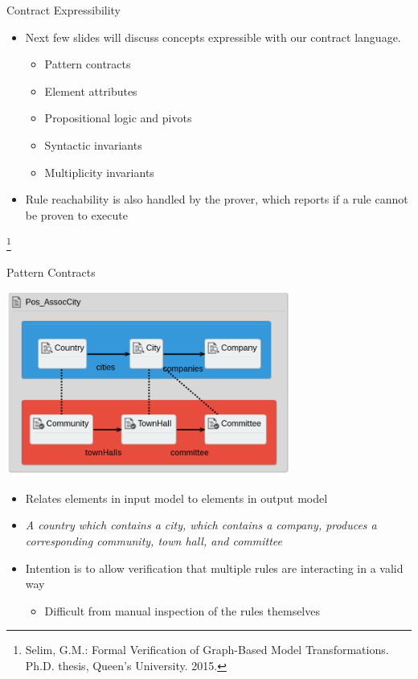 \documentclass[xcolor=dvipsnames, 12pt, handout]{beamer}
\newcommand\blfootnote[1]{%
  \begingroup
  \renewcommand\thefootnote{}\footnote{#1}%
  \addtocounter{footnote}{-1}%
  \endgroup
}
\begin{document}
\begin{frame}{Contract Expressibility}

\begin{itemize}[<+->]
\item Next few slides will discuss concepts expressible with our contract language.

\begin{itemize}[<+->]
\item Pattern contracts
\item Element attributes
\item Propositional logic and pivots
\item Syntactic invariants
\item Multiplicity invariants
\end{itemize}
\end{itemize}

\begin{itemize}
\item Rule reachability is also handled by the prover, which reports if a rule cannot be proven to execute
\end{itemize}

\blfootnote{Selim, G.M.: Formal Verification of Graph-Based Model Transformations. Ph.D. thesis, Queen’s University. 2015.}
\end{frame}

\begin{frame}{Pattern Contracts}
\begin{center}
\includegraphics[width=0.7\textwidth]{figures/Pos_AssocCity}
\end{center}
\begin{itemize}
\item Relates elements in input model to elements in output model
\item \textit{A country which contains a city, which contains a company, produces a corresponding community, town hall, and committee}
\item Intention is to allow verification that multiple rules are interacting in a valid way
\begin{itemize}
\item Difficult from manual inspection of the rules themselves
\end{itemize}
\end{itemize}
\end{frame}
\end{document}
